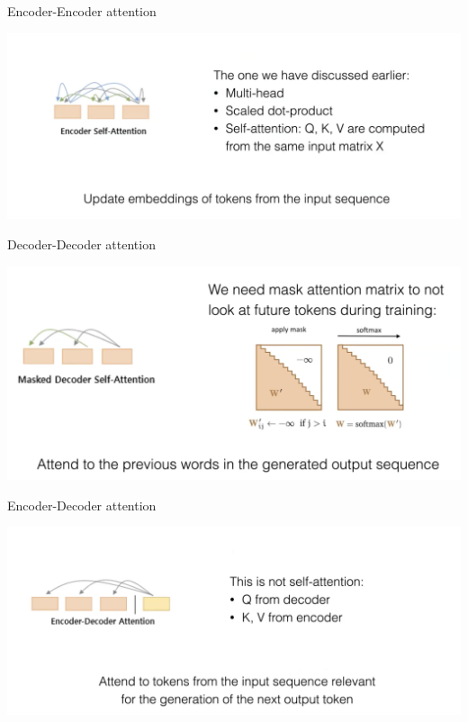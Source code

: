 \documentclass[notes,12pt, aspectratio=169]{beamer}
\begin{document}
\begin{frame}{Encoder-Encoder attention}
	\begin{center}
		\includegraphics[width=.99\linewidth]{enc_enc_att.png}
	\end{center}
\end{frame}


\begin{frame}{Decoder-Decoder attention}
	\begin{center}
		\includegraphics[width=.99\linewidth]{dec_dec_att.png}
	\end{center}
\end{frame}


\begin{frame}{Encoder-Decoder attention}
	\begin{center}
		\includegraphics[width=.99\linewidth]{enc_dec_att.png}
	\end{center}
\end{frame}
\end{document}
